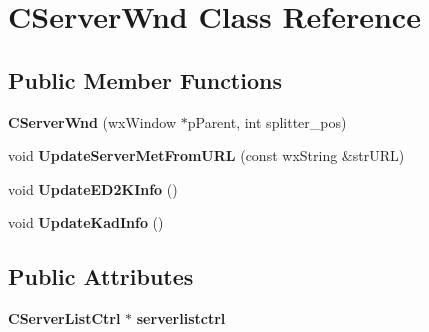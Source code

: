\section{CServerWnd Class Reference}
\label{classCServerWnd}
\subsection*{Public Member Functions}
\begin{DoxyCompactItemize}
\item 
{\bfseries CServerWnd} (wxWindow $\ast$pParent, int splitter\_\-pos)\label{classCServerWnd_a58fed716868a43c54651a8dc793e6578}

\item 
void {\bfseries UpdateServerMetFromURL} (const wxString \&strURL)\label{classCServerWnd_aca0639c8aa28e3f9222d476193988e99}

\item 
void {\bfseries UpdateED2KInfo} ()\label{classCServerWnd_aa53bb35efbf3ad51c2fe7ebe4d6cf220}

\item 
void {\bfseries UpdateKadInfo} ()\label{classCServerWnd_a7e163665bb2107de15cee3f7c2d46b5e}

\end{DoxyCompactItemize}
\subsection*{Public Attributes}
\begin{DoxyCompactItemize}
\item 
{\bf CServerListCtrl} $\ast$ {\bfseries serverlistctrl}\label{classCServerWnd_a3c0b204f514709edf6580b642d1b09b8}

\end{DoxyCompactItemize}
